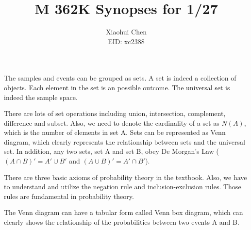 \documentclass[12pt]{article}
\author{Xiaohui Chen \\EID: xc2388}
\title{M 362K Synopses for 1/27}
\begin{document}
\maketitle
\begin{spacing}{2.0}

The samples and events can be grouped as sets. A set is indeed a collection of objects. Each element in the set is an possible outcome. The universal set is indeed the sample space.

There are lots of set operations including union, intersection, complement, difference and subset. Also, we need to denote the cardinality of a set as $N(A)$, which is the number of elements in set A. Sets can be represented as Venn diagram, which clearly represents the relationship between sets and the universal set. In addition, any two sets, set A and set B, obey De Morgan's Law ($(A\cap B)' = A' \cup B'$ and $(A\cup B)'=A'\cap B'$).

There are three basic axioms of probability theory in the textbook. Also, we have to understand and utilize the negation rule and inclusion-exclusion rules. Those rules are fundamental in probability theory.

The Venn diagram can have a tabular form called Venn box diagram, which can clearly shows the relationship of the probabilities between two events A and B.
\end{spacing}
\end{document}
